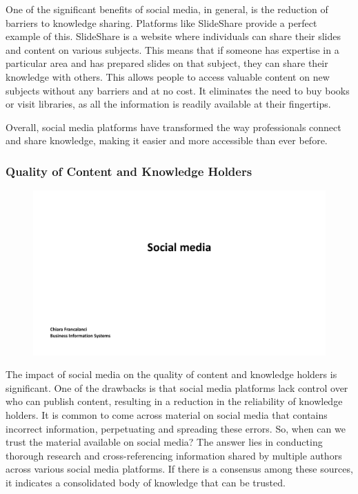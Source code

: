 One of the significant benefits of social media, in general, is the
reduction of barriers to knowledge sharing. Platforms like SlideShare
provide a perfect example of this. SlideShare is a website where
individuals can share their slides and content on various subjects. This
means that if someone has expertise in a particular area and has
prepared slides on that subject, they can share their knowledge with
others. This allows people to access valuable content on new subjects
without any barriers and at no cost. It eliminates the need to buy books
or visit libraries, as all the information is readily available at their
fingertips.

Overall, social media platforms have transformed the way professionals
connect and share knowledge, making it easier and more accessible than
ever before.

\subsubsection{Quality of Content and Knowledge
  Holders}\label{quality-of-content-and-knowledge-holders}

\begin{figure}[!h]
  \centering
  \includegraphics[page=4, trim = 1.5cm 4cm 2cm 4cm, clip, width=\imagewidth]{images/04 - Social_Media.pdf}
\end{figure}

The impact of social media on the quality of content and knowledge
holders is significant. One of the drawbacks is that social media
platforms lack control over who can publish content, resulting in a
reduction in the reliability of knowledge holders. It is common to come
across material on social media that contains incorrect information,
perpetuating and spreading these errors. So, when can we trust the
material available on social media? The answer lies in conducting
thorough research and cross-referencing information shared by multiple
authors across various social media platforms. If there is a consensus
among these sources, it indicates a consolidated body of knowledge that
can be trusted.


